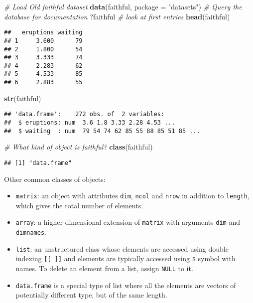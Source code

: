 \documentclass[]{book}
\newenvironment{Shaded}{\begin{snugshade}}{\end{snugshade}}
\newcommand{\CommentTok}[1]{\textcolor[rgb]{0.56,0.35,0.01}{\textit{#1}}}
\newcommand{\DataTypeTok}[1]{\textcolor[rgb]{0.13,0.29,0.53}{#1}}
\newcommand{\KeywordTok}[1]{\textcolor[rgb]{0.13,0.29,0.53}{\textbf{#1}}}
\newcommand{\NormalTok}[1]{#1}
\newcommand{\StringTok}[1]{\textcolor[rgb]{0.31,0.60,0.02}{#1}}
\providecommand{\tightlist}{%
  \setlength{\itemsep}{0pt}\setlength{\parskip}{0pt}}
\theoremstyle{definition}
\theoremstyle{definition}
\theoremstyle{definition}
\theoremstyle{remark}
\begin{document}
\begin{Shaded}
\begin{Highlighting}[]
\CommentTok{# Load Old faithful dataset}
\KeywordTok{data}\NormalTok{(faithful, }\DataTypeTok{package =} \StringTok{"datasets"}\NormalTok{)}
\CommentTok{# Query the database for documentation}
\NormalTok{?faithful}
\CommentTok{# look at first entries}
\KeywordTok{head}\NormalTok{(faithful)}
\end{Highlighting}
\end{Shaded}

\begin{verbatim}
##   eruptions waiting
## 1     3.600      79
## 2     1.800      54
## 3     3.333      74
## 4     2.283      62
## 5     4.533      85
## 6     2.883      55
\end{verbatim}

\begin{Shaded}
\begin{Highlighting}[]
\KeywordTok{str}\NormalTok{(faithful)}
\end{Highlighting}
\end{Shaded}

\begin{verbatim}
## 'data.frame':    272 obs. of  2 variables:
##  $ eruptions: num  3.6 1.8 3.33 2.28 4.53 ...
##  $ waiting  : num  79 54 74 62 85 55 88 85 51 85 ...
\end{verbatim}

\begin{Shaded}
\begin{Highlighting}[]
\CommentTok{# What kind of object is faithful? }
\KeywordTok{class}\NormalTok{(faithful)}
\end{Highlighting}
\end{Shaded}

\begin{verbatim}
## [1] "data.frame"
\end{verbatim}

Other common classes of objects:

\begin{itemize}
\tightlist
\item
  \texttt{matrix}: an object with attributes \texttt{dim}, \texttt{ncol}
  and \texttt{nrow} in addition to \texttt{length}, which gives the
  total number of elements.
\item
  \texttt{array}: a higher dimensional extension of \texttt{matrix} with
  arguments \texttt{dim} and \texttt{dimnames}.
\item
  \texttt{list}: an unstructured class whose elements are accessed using
  double indexing \texttt{{[}{[}\ {]}{]}} and elements are typically
  accessed using \texttt{\$} symbol with names. To delete an element
  from a list, assign \texttt{NULL} to it.
\item
  \texttt{data.frame} is a special type of list where all the elements
  are vectors of potentially different type, but of the same length.
\end{itemize}
\end{document}
